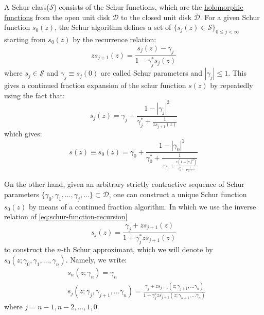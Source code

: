 \documentclass[
	preprint,%
	aps,
	prb,
	showpacs,	
	amsmath, amssymb]{revtex4-2}
\newcommand{\D}{ {\mathcal{D}} }
\newcommand{\Dbar}{ {\bar{\mathcal{D}}} }
\begin{document}
A Schur class($\mathcal{S}$) consists of the Schur functions, which are the 
\href{https://en.wikipedia.org/wiki/Holomorphic_function}{holomorphic functions} 
from the open unit disk $\D$ to 
the closed unit disk $\Dbar$. 
For a given Schur function $s_0(z)$, the Schur algorithm defines a set of
$\{s_j(z) \in \mathcal{S}\}_{0\leq j <\infty}$ starting from $s_0(z)$ by the recurrence relation:
\begin{equation}\label{eq:schur-function-recursion}
	zs_{j+1}(z) = \frac{s_j(z) - \gamma_j}{1 - \gamma_j^* s_j(z)}
\end{equation}
where $s_j \in \mathcal{S}$ and $\gamma_j \equiv s_j(0)$ are called Schur 
parameters and $|\gamma_j| \leq 1$. This gives a continued fraction 
expansion of the schur function $s(z)$ by repeatedly using the fact 
that:
\begin{equation}\label{eq:inv-schur-function-recursion-frac}
	s_{j}(z) = \gamma_j + \frac{1 - |\gamma_j|^2}
		{\gamma_j^* + \frac{1}{zs_{j+1}(z)}}
\end{equation}
which gives:
\begin{equation}\label{eq:schur-fraction-expansion}
	s(z) \equiv s_0(z) = \gamma_0 + \frac{1 - |\gamma_0|^2}
		{\gamma_0^* + \frac{1}
		{z\gamma_1 + \frac{z(1 - |\gamma_1|^2)}
		{\gamma_1^* + \frac{1}{z\gamma_2 + \cdots}}
		}
		}
\end{equation}

On the other hand, given an arbitrary strictly contractive sequence 
of Schur parameters $\{\gamma_0, \gamma_1, \dots, \gamma_j, \dots\} \subset \D$, 
one can construct a unique Schur function $s_0(z)$ by means of a continued 
fraction algorithm. In which we use the inverse relation of
\cref{eq:schur-function-recursion}
\begin{equation}\label{eq:inv-schur-function-recursion}
	s_j(z) = \frac{\gamma_j + zs_{j+1}(z)}{1 + \gamma_j^* z s_{j+1}(z)}
\end{equation}
to construct the $n$-th Schur approximant, 
which we will denote by 
$s_0(z; \gamma_0,\gamma_1, \dots, \gamma_n)$. Namely, we write:
\begin{align}
	\label{eq:schur-continued-fraction-1}
	&s_n(z;\gamma_n) = \gamma_n \\
	\label{eq:schur-continued-fraction-2}
	&s_j(z;\gamma_j,\gamma_{j+1},\dots \gamma_n) 
	= \frac{\gamma_j + zs_{j+1}(z;\gamma_{j+1},\dots \gamma_n)}
		{1 + \gamma_j^* z s_{j+1}(z;\gamma_{k+1},\dots \gamma_n)}
\end{align}
where $j = n-1, n-2, \dots, 1, 0$.
\end{document}
